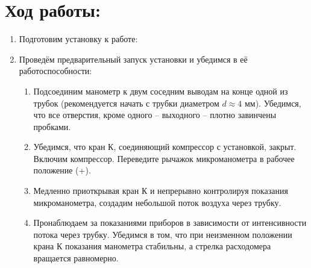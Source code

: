 \documentclass[a4paper,12pt]{article}
\begin{document}
\section{Ход работы:}
\begin{enumerate}
\renewcommand{\labelenumii}{\arabic{enumii})}
\itemsep0em
\item Подготовим установку к работе:
\item Проведём предварительный запуск установки и убедимся в её работоспособности:
	\begin{enumerate}
	\item Подсоединим манометр к двум соседним выводам на конце одной из трубок 				(рекомендуется начать с трубки диаметром $d \approx 4$ мм). Убедимся, что все отверстия, кроме одного -- выходного -- плотно завинчены пробками.
	\item Убедимся, что кран К, соединяющий компрессор с установкой, закрыт. Включим компрессор. Переведите рычажок микроманометра в рабочее положение (+).
	\item Медленно приоткрывая кран К и непрерывно контролируя показания микроманометра, создадим небольшой поток воздуха через трубку. 
	\item Пронаблюдаем за показаниями приборов в зависимости от интенсивности потока  через  трубку.  Убедимся в том,  что  при  неизменном  положении крана К показания манометра стабильны, а стрелка расходомера вращается равномерно.
	\end{enumerate}
	

\end{enumerate}
\end{document}
